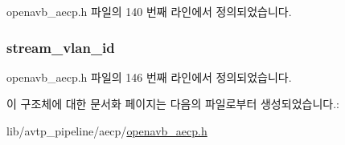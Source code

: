 openavb\+\_\+aecp.\+h 파일의 140 번째 라인에서 정의되었습니다.

\subsubsection[{\texorpdfstring{stream\+\_\+vlan\+\_\+id}{stream_vlan_id}}]{ stream\+\_\+vlan\+\_\+id}\hypertarget{structopenavb__aecp__commandresponse__data__set__stream__info__t_a31db70d552fc6f5d35875430fca593e6}{}\label{structopenavb__aecp__commandresponse__data__set__stream__info__t_a31db70d552fc6f5d35875430fca593e6}


openavb\+\_\+aecp.\+h 파일의 146 번째 라인에서 정의되었습니다.



이 구조체에 대한 문서화 페이지는 다음의 파일로부터 생성되었습니다.\+:\begin{DoxyCompactItemize}
\item 
lib/avtp\+\_\+pipeline/aecp/\hyperlink{openavb__aecp_8h}{openavb\+\_\+aecp.\+h}\end{DoxyCompactItemize}

